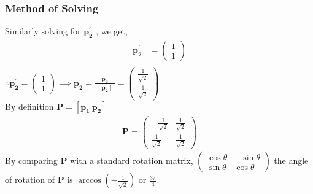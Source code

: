 \documentclass{beamer}
\providecommand{\sbrak}[1]{\ensuremath{{}\left[#1\right]}}
\providecommand{\brak}[1]{\ensuremath{\left(#1\right)}}
\theoremstyle{remark}
\providecommand{\norm}[1]{\lVert#1\rVert}
\newcommand{\myvec}[1]{\ensuremath{\begin{pmatrix}#1\end{pmatrix}}}
\let\vec\mathbf
\numberwithin{equation}{section}
\begin{document}
\begin{frame}
	\frametitle{Method of Solving}
	Similarly solving for $\vec{p_2^\prime}$ , we get,
	\begin{align}
		\vec{p_2^\prime} &=  \myvec{1 \\ 1} \\
	\end{align} 
	$\therefore \vec{p_2^\prime}  = \myvec{1 \\ 1} \implies \vec{p_2} = \frac{\vec{p_2^\prime} }{\norm{\vec{p_2^\prime}}}  = \myvec{ \frac{1}{\sqrt{2}} \\ \frac{1}{\sqrt{2}}}$ \\
	By definition $\vec{P} = \sbrak{\vec{p_1} ~ \vec{p_2}}$ \\ 
	
	\begin{align}
		\vec{P} = \myvec{ - \frac{1}{\sqrt{2}} & \frac{1}{\sqrt{2}} \\ \frac{1}{\sqrt{2}} & \frac{1}{\sqrt{2}} } \label{Rdef}
	\end{align}
	By comparing $\vec{P}$ with a standard rotation matrix, $\myvec{\cos\theta & -\sin\theta \\ \sin\theta & \cos\theta}$
	the angle of rotation of $\vec{P}$ is $\arccos\brak{- \frac{1}{\sqrt{2}}}$ or $\frac{3\pi}{4}$. \\\\
\end{frame}
\end{document}
